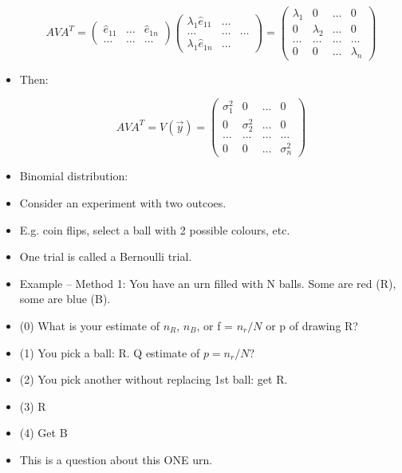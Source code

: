 \begin{itemize}
    \[ A V A^T = \begin{pmatrix}
        \hat{e}_{11} & \ldots & \hat{e}_{1n} \\
        \ldots & \ldots & \ldots 
    \end{pmatrix}
    \begin{pmatrix}
        \lambda_1 \hat{e}_{11} & \ldots  \\
        \ldots & \ldots & \ldots \\
        \lambda_1 \hat{e}_{1n} & \ldots
    \end{pmatrix}
    = \begin{pmatrix}
        \lambda_1 & 0 & \ldots & 0 \\
        0 & \lambda_2 & \ldots & 0 \\
        \ldots & \ldots & \ldots & \ldots \\
        0 & 0 & \ldots & \lambda_n
    \end{pmatrix} \]

    \item Then:

    \[ AVA^T = V(\vec{y}) = \begin{pmatrix}
        \sigma_1^2 & 0 & \ldots & 0 \\
        0 & \sigma_2^2 & \ldots & 0 \\
        \ldots & \ldots & \ldots & \ldots \\
        0 & 0 & \ldots & \sigma_n^2
    \end{pmatrix} \]
    \item Binomial distribution:
    \item Consider an experiment with two outcoes.
    \item E.g. coin flips, select a ball with 2 possible colours, etc.
    \item One trial is called a Bernoulli trial.
    \item Example -- Method 1: You have an urn filled with N balls. Some are red (R), some are blue (B).
    \item (0) What is your estimate of $n_R$, $n_B$, or f = $n_r/N$ or p of drawing R? 
    \item (1) You pick a ball: R. Q estimate of $p=n_r/N$?
    \item (2) You pick another without replacing 1st ball: get R.
    \item (3) R 
    \item (4) Get B 
    \item This is a question about this ONE urn.
    

\end{itemize}
